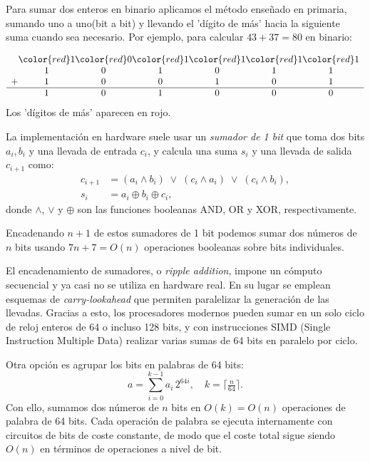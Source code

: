 Para sumar dos enteros en binario aplicamos el método enseñado en primaria, sumando uno a uno(bit a bit) y llevando el 'dígito de más' hacia la siguiente suma cuando sea necesario. Por ejemplo, para calcular \(43+37=80\) en binario:

\[
\begin{array}{r@{}c@{}c@{}c@{}c@{}c@{}c}
 & {\color{red}1} & {\color{red}0} & {\color{red}1} & {\color{red}1} & {\color{red}1} & {\color{red}1}\\
 & 1&0&1&0&1&1\\
+& 1&0&0&1&0&1\\\hline
 & 1&0&1&0&0&0\\
\end{array}
\]
Los 'dígitos de más' aparecen en rojo.

La implementación en hardware suele usar un \emph{sumador de 1 bit} que toma dos bits \(a_i,b_i\) y una llevada de entrada \(c_i\), y calcula una suma \(s_i\) y una llevada de salida \(c_{i+1}\) como:
\[
\begin{aligned}
c_{i+1} &= (a_i\land b_i)\;\lor\;(c_i\land a_i)\;\lor\;(c_i\land b_i),\\
s_i     &= a_i\oplus b_i\oplus c_i,
\end{aligned}
\]
donde \(\land\), \(\lor\) y \(\oplus\) son las funciones booleanas AND, OR y XOR, respectivamente.  

Encadenando \(n+1\) de estos sumadores de 1 bit podemos sumar dos números de \(n\) bits usando \(7n+7 = O(n)\) operaciones booleanas sobre bits individuales.  

\begin{remark}
El encadenamiento de sumadores, o \emph{ripple addition}, impone un cómputo secuencial y ya casi no se utiliza en hardware real. En su lugar se emplean esquemas de \emph{carry-lookahead} que permiten paralelizar la generación de las llevadas. Gracias a esto, los procesadores modernos pueden sumar en un solo ciclo de reloj enteros de 64 o incluso 128 bits, y con instrucciones SIMD (Single Instruction Multiple Data) realizar varias sumas de 64 bits en paralelo por ciclo.  

Otra opción es agrupar los bits en palabras de 64 bits:  
\[
  a = \sum_{i=0}^{k-1} a_i\,2^{64i},
  \quad k = \bigl\lceil \tfrac{n}{64}\bigr\rceil.
\]
Con ello, sumamos dos números de \(n\) bits en \(O(k)=O(n)\) operaciones de palabra de 64 bits. Cada operación de palabra se ejecuta internamente con circuitos de bits de coste constante, de modo que el coste total sigue siendo \(O(n)\) en términos de operaciones a nivel de bit.
\end{remark}


